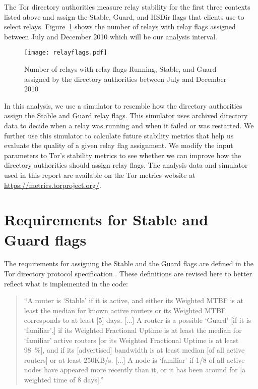 \documentclass{article}
\begin{document}
The Tor directory authorities measure relay stability for the first three
contexts listed above and assign the Stable, Guard, and HSDir flags that
clients use to select relays.
Figure~\ref{fig:relayflags} shows the number of relays with relay flags
assigned between July and December 2010 which will be our analysis
interval.

\begin{figure}[t]
\texttt{[image: relayflags.pdf]}
\caption{Number of relays with relay flags Running, Stable, and Guard
assigned by the directory authorities between July and December 2010}
\label{fig:relayflags}
\end{figure}

In this analysis, we use a simulator to resemble how the directory
authorities assign the Stable and Guard relay flags.
This simulator uses archived directory data to decide when a relay was
running and when it failed or was restarted.
We further use this simulator to calculate future stability metrics that
help us evaluate the quality of a given relay flag assignment.
We modify the input parameters to Tor's stability metrics to see whether
we can improve how the directory authorities should assign relay flags.
The analysis data and simulator used in this report are available on the
Tor metrics website at \url{https://metrics.torproject.org/}.

\section{Requirements for Stable and Guard flags}

The requirements for assigning the Stable and the Guard flags are defined
in the Tor directory protocol specification \cite{dirspec}.
These definitions are revised here to better reflect what is implemented
in the code:

\begin{quote}
``A router is `Stable' if it is active, and either its Weighted MTBF is at
least the median for known active routers or its Weighted MTBF corresponds
to at least [5] days.
[...]
A router is a possible `Guard' [if it is `familiar',] if its
Weighted Fractional
Uptime is at least the median for `familiar' active routers [or its
Weighted Fractional Uptime is at least 98~\%], and if
its [advertised] bandwidth is at least median [of all active routers] or
at least 250KB/s.
[...]
A node is `familiar' if 1/8 of all active nodes have appeared more
recently than it, or it has been around for [a weighted time of 8 days].''
\end{quote}
\end{document}

